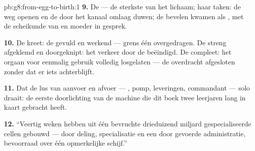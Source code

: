 \begin{solution}{pb:g8:from-egg-to-birth:1}
\textbf{9.} De  --- de sterkste  van het lichaam; haar
taken: de weg openen en de  door het kanaal omlaag duwen; de bevelen
kwamen als , met de scheikunde van  en moeder in gesprek.

\textbf{10.} De kreet: de  gevuld en werkend --- grens één
overgedragen. De streng afgeklemd en doorgeknipt: het verkeer door de
 beëindigd. De  compleet: het orgaan voor eenmalig
gebruik volledig losgelaten --- de overdracht afgesloten zonder dat er
iets achterblijft.

\textbf{11.} Dat de lus van aanvoer en afvoer --- , pomp,
leveringen, commandant --- solo draait: de eerste doorlichting van de
machine die dit boek twee leerjaren lang in kaart gebracht heeft.

\textbf{12.} ``Veertig weken hebben uit één bevruchte  drieduizend
miljard gespecialiseerde cellen gebouwd --- door deling, specialisatie en
een door  gevoerde administratie, bevoorraad over één opmerkelijke
schijf.''
\end{solution}
